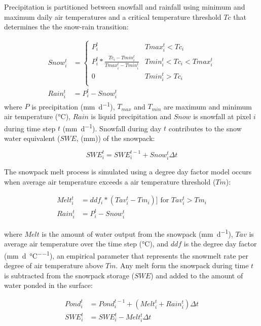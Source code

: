 \documentclass[review]{elsarticle}
\begin{document}
Precipitation is partitioned between snowfall and rainfall using minimum and maximum daily air temperatures and a critical temperature threshold $Tc$ that determines the the snow-rain transition:

\begin{align}
Snow_i^t &= \left\{
	\begin{array}{ll}
	P_i^t &  Tmax_i^t < Tc_i \\   
	P_i^t * \frac{Tc_i - Tmin_i^t}{Tmax_i^t - Tmin_i^t} & Tmin_i^t < Tc_i < Tmax_i^t \\
	0 &  Tmin_i^t > Tc_i \\
	\end{array}
\right.\\
Rain_i^t &= P_i^t - Snow_i^t 	 
\end{align} 
\noindent where $P$ is precipitation (\si{\milli\metre\per\day}), $T_{max}$ and $T_{min}$ are maximum and minimum air temperature (\si{\degreeCelsius}), $Rain$ is liquid precipitation and $Snow$ is snowfall at pixel $i$ during time step $t$ (\si{\milli\metre\per\day}). Snowfall during day $t$ contributes to the snow water equivalent ($SWE$, (\si{\milli\metre})) of the snowpack:

\begin{equation}
SWE_i^t = SWE_i^{t-1} + Snow_i^t \Delta t
\end{equation}

The snowpack melt process is simulated using a degree day factor model occurs when average air temperature exceeds a air temperature threshold ($Tm$):

\begin{align}
Melt_i^t &= ddf_i * (Tav_i^t - Tm_i)  ]\text{ for } Tav_i^t > Tm_i \\
Rain_i^t &= P_i^t - Snow_i^t 	 
\end{align} 

\noindent where $Melt$ is the amount of water output from the snowpack (\si{\milli\metre\per\day}), $Tav$ is average air temperature over the time step (\si{\degreeCelsius}), and $ddf$ is the degree day factor (\si{\milli\metre\per\day\per\degreeCelsius}), an empirical parameter that represents the snowmelt rate per degree of air temperature above $Tm$. Any melt form the snowpack during time $t$ is subtracted from the snowpack storage ($SWE$) and added to the amount of water ponded in the surface: 

\begin{align}
Pond_i^t &= Pond_i^{t-1} + (Melt_i^t + Rain_i^t)\Delta t \\
SWE_i^t &= SWE_i^t - Melt_i^t \Delta t 	 
\end{align} 
\end{document}
